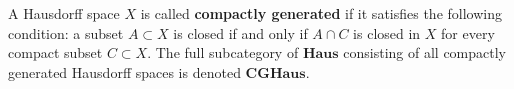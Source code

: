 A Hausdorff space $X$ is called \textbf{compactly generated} if it satisfies the following condition: a subset $A \subset X$ is closed if and only if $A \cap C$ is closed in $X$ for every compact subset $C \subset X$. The full subcategory of $\mathbf{Haus}$ consisting of all compactly generated Hausdorff spaces is denoted $\mathbf{CGHaus}$.
